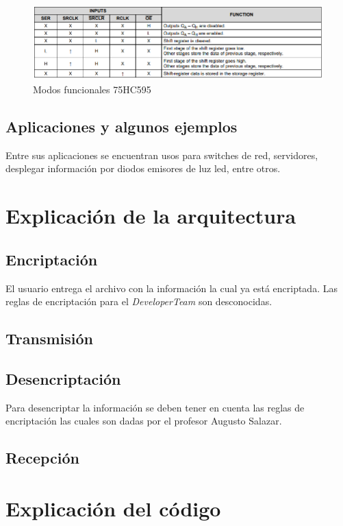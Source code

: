 \documentclass{article}
\begin{document}
    \begin{figure}[h]
    \includegraphics[width=12cm]{imagen/Modos.png}
    \centering
    \caption{Modos funcionales 75HC595}
    \label{fig:Modos}
    \end{figure}
    
\subsection{Aplicaciones y algunos ejemplos}
Entre sus aplicaciones se encuentran usos para switches de red, servidores, desplegar información por diodos emisores de luz led, entre otros.


\section{Explicación de la arquitectura} 
\subsection{Encriptación}
El usuario entrega el archivo con la información la cual ya está encriptada. Las reglas de encriptación para el \textit{DeveloperTeam} son desconocidas.

\subsection{Transmisión}

\subsection{Desencriptación}
Para desencriptar la información se deben tener en cuenta las reglas de encriptación las cuales son dadas por el profesor Augusto Salazar.

\subsection{Recepción}


\section{Explicación del código} 
 
\end{document}
